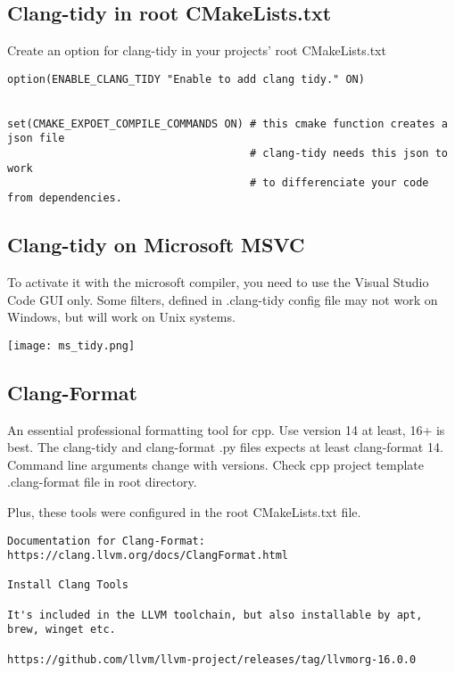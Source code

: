 \subsection{Clang-tidy in root CMakeLists.txt}

Create an option for clang-tidy in your projects' root CMakeLists.txt

\begin{verbatim}
option(ENABLE_CLANG_TIDY "Enable to add clang tidy." ON)


set(CMAKE_EXPOET_COMPILE_COMMANDS ON) # this cmake function creates a json file
                                      # clang-tidy needs this json to work
                                      # to differenciate your code from dependencies.

\end{verbatim}


\subsection{Clang-tidy on Microsoft MSVC}

To activate it with the microsoft compiler, you need to use the Visual Studio Code GUI only.
Some filters, defined in .clang-tidy config file may not work on Windows, but will work on Unix systems.

\begin{center}
    \texttt{[image: ms\_tidy.png]}
\end{center}

 
\subsection{Clang-Format}

An essential professional formatting tool for cpp. Use version 14 at least, 16+ is best. The 
clang-tidy and clang-format .py files expects at least clang-format 14. Command line arguments 
change with versions. Check cpp project template .clang-format file in root directory.

Plus, these tools were configured in the root CMakeLists.txt file.

\begin{verbatim}
Documentation for Clang-Format: https://clang.llvm.org/docs/ClangFormat.html

Install Clang Tools

It's included in the LLVM toolchain, but also installable by apt, brew, winget etc.

https://github.com/llvm/llvm-project/releases/tag/llvmorg-16.0.0
\end{verbatim}


